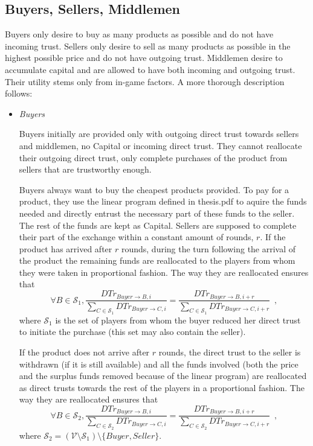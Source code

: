\subsection{Buyers, Sellers, Middlemen}
  Buyers only desire to buy as many products as possible and do not have incoming trust. Sellers only desire to sell as many
  products as possible in the highest possible price and do not have outgoing trust. Middlemen desire to accumulate capital
  and are allowed to have both incoming and outgoing trust. Their utility stems only from in-game factors. A more thorough
  description follows:

  \begin{itemize}
    \item \textit{Buyers}

    Buyers initially are provided only with outgoing direct trust towards sellers and middlemen, no Capital or incoming direct
    trust. They cannot reallocate their outgoing direct trust, only complete purchases of the product from sellers that are
    trustworthy enough.
    
    Buyers always want to buy the cheapest products provided. To pay for a product, they use the linear program defined in
    thesis.pdf to aquire the funds needed and directly entrust the necessary part of these funds to the seller. The rest of
    the funds are kept as Capital. Sellers are supposed to complete their part of the exchange within a constant amount of
    rounds, $r$. If the product has arrived after $r$ rounds, during the turn following the arrival of the product the
    remaining funds are reallocated to the players from whom they were taken in proportional fashion. The way they are
    reallocated ensures that
    \begin{equation*}
      \forall B \in \mathcal{S}_1, \frac{DTr_{Buyer \rightarrow B, i}}{\sum\limits_{C \in \mathcal{S}_1}DTr_{Buyer \rightarrow
      C, i}} = \frac{DTr_{Buyer \rightarrow B, i + r}}{\sum\limits_{C \in \mathcal{S}_1}DTr_{Buyer \rightarrow C, i + r}}
      \enspace,
    \end{equation*}
    where $\mathcal{S}_1$ is the set of players from whom the buyer reduced her direct trust to initiate the purchase (this
    set may also contain the seller).

    If the product does not arrive after $r$ rounds, the direct trust to the seller is withdrawn (if it is still available)
    and all the funds involved (both the price and the surplus funds removed because of the linear program) are reallocated as
    direct trusts towards the rest of the players in a proportional fashion. The way they are reallocated ensures that
    \begin{equation*}
      \forall B \in \mathcal{S}_2, \frac{DTr_{Buyer \rightarrow B, i}}{\sum\limits_{C \in \mathcal{S}_2}DTr_{Buyer \rightarrow
      C, i}} = \frac{DTr_{Buyer \rightarrow B, i + r}}{\sum\limits_{C \in \mathcal{S}_2}DTr_{Buyer \rightarrow C, i + r}}
      \enspace,
    \end{equation*}
    where $\mathcal{S}_2 = \left(\mathcal{V} \setminus \mathcal{S}_1\right) \setminus{\{Buyer, Seller\}}$.


\end{itemize}
